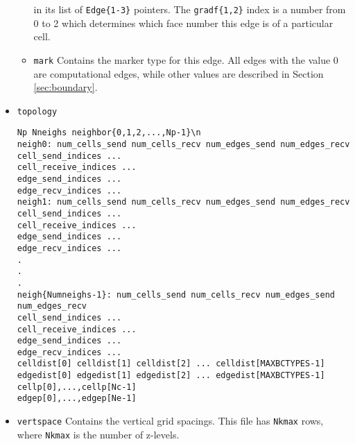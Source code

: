 \begin{itemize}
\begin{itemize}
in its list of \verb+Edge{1-3}+ pointers.  The \verb+gradf{1,2}+ index is a number from 
0 to 2 which determines which face number this edge is of a particular cell.
\item \verb+mark+ Contains the marker type for this edge.  All edges with the value 0 are
computational edges, while other values are described in Section \ref{sec:boundary}.
\end{itemize}
\item \verb+topology+
\begin{verbatim}
Np Nneighs neighbor{0,1,2,...,Np-1}\n
neigh0: num_cells_send num_cells_recv num_edges_send num_edges_recv
cell_send_indices ...
cell_receive_indices ...
edge_send_indices ...
edge_recv_indices ...
neigh1: num_cells_send num_cells_recv num_edges_send num_edges_recv
cell_send_indices ...
cell_receive_indices ...
edge_send_indices ...
edge_recv_indices ...
.
.
.
neigh{Numneighs-1}: num_cells_send num_cells_recv num_edges_send num_edges_recv
cell_send_indices ...
cell_receive_indices ...
edge_send_indices ...
edge_recv_indices ...
celldist[0] celldist[1] celldist[2] ... celldist[MAXBCTYPES-1]
edgedist[0] edgedist[1] edgedist[2] ... edgedist[MAXBCTYPES-1]
cellp[0],...,cellp[Nc-1]
edgep[0],...,edgep[Ne-1]
\end{verbatim}
\item \verb+vertspace+ Contains the vertical grid spacings.  This file has \verb+Nkmax+ rows,
where \verb+Nkmax+ is the number of z-levels.
\end{itemize}
